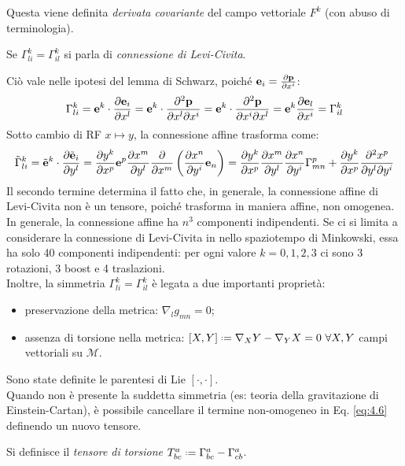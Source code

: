 Questa viene definita \textit{derivata covariante} del campo vettoriale $ F^k $ (con abuso di terminologia).
\begin{definition}
	Se $ \Gamma^k_{li} = \Gamma^k_{il} $ si parla di \textit{connessione di Levi-Civita}.
\end{definition}
Ciò vale nelle ipotesi del lemma di Schwarz, poiché $ \mathbf{e}_i = \frac{\partial \mathbf{p}}{\partial x^i} $:
\begin{equation}
	\Gamma^k_{li} = \mathbf{e}^k \cdot \frac{\partial \mathbf{e}_i}{\partial x^l} = \mathbf{e}^k \cdot \frac{\partial^2 \mathbf{p}}{\partial x^l \partial x^i} = \mathbf{e}^k \cdot \frac{\partial^2 \mathbf{p}}{\partial x^i \partial x^l} = \mathbf{e}^k \frac{\partial \mathbf{e}_l}{\partial x^i} = \Gamma^k_{il}
	\label{eq:4.5}
\end{equation}
Sotto cambio di RF $ x \mapsto y $, la connessione affine trasforma come:
\begin{equation}
	\tilde{\Gamma}^k_{li} = \tilde{\mathbf{e}}^k \cdot \frac{\partial \tilde{\mathbf{e}}_i}{\partial y^l} = \frac{\partial y^k}{\partial x^p}\mathbf{e}^p \frac{\partial x^m}{\partial y^l} \frac{\partial}{\partial x^m} \left( \frac{\partial x^n}{\partial y^i} \mathbf{e}_n \right) = \frac{\partial y^k}{\partial x^p} \frac{\partial x^m}{\partial y^l} \frac{\partial x^n}{\partial y^i} \Gamma^p_{mn} + \frac{\partial y^k}{\partial x^p} \frac{\partial^2 x^p}{\partial y^l \partial y^i}
	\label{eq:4.6}
\end{equation}
Il secondo termine determina il fatto che, in generale, la connessione affine di Levi-Civita non è un tensore, poiché trasforma in maniera affine, non omogenea.\\
In generale, la connessione affine ha $ n^3 $ componenti indipendenti. Se ci si limita a considerare la connessione di Levi-Civita in nello spaziotempo di Minkowski, essa ha solo 40 componenti indipendenti: per ogni valore $ k = 0,1,2,3 $ ci sono 3 rotazioni, 3 boost e 4 traslazioni.\\
Inoltre, la simmetria $ \Gamma^k_{li} = \Gamma^k_{il} $ è legata a due importanti proprietà:
\begin{itemize}
	\item preservazione della metrica: $ \nabla_l g_{mn} = 0 $;
	\item assenza di torsione nella metrica: $ \left[ X,Y \right] \defeq \nabla_X Y - \nabla_Y X = 0 \,\,\forall X,Y$ campi vettoriali su $ \mathcal{M} $.
\end{itemize}
Sono state definite le parentesi di Lie $ \left[ \cdot,\cdot \right] $.\\
Quando non è presente la suddetta simmetria (es: teoria della gravitazione di Einstein-Cartan), è possibile cancellare il termine non-omogeneo in  Eq. \ref{eq:4.6} definendo un nuovo tensore.
\begin{definition}
	Si definisce il \textit{tensore di torsione} $ T^a_{bc} \defeq \Gamma^a_{bc} - \Gamma^a_{cb} $.
\end{definition}

